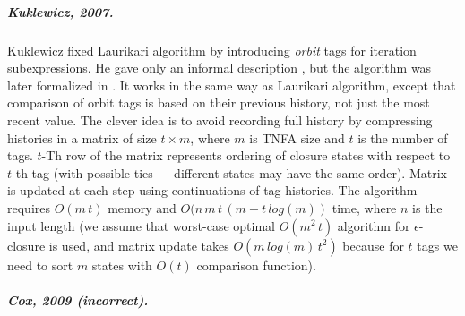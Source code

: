 \documentclass[AMA,STIX1COL]{WileyNJD-v2}
\begin{document}
\subparagraph{Kuklewicz, 2007.}

Kuklewicz fixed Laurikari algorithm by introducing \emph{orbit} tags for iteration subexpressions.
He gave only an informal description \cite{Kuk07}, but the algorithm was later formalized in \cite{Tro17}.
It works in the same way as Laurikari algorithm,
except that comparison of orbit tags is based on their previous history, not just the most recent value.
The clever idea is to avoid recording full history
by compressing histories in a matrix of size $t \times m$, where $m$ is TNFA size and $t$ is the number of tags.
$t$-Th row of the matrix represents ordering of closure states with respect to $t$-th tag
(with possible ties --- different states may have the same order).
Matrix is updated at each step using continuations of tag histories.
The algorithm requires $O(m \, t)$ memory and $O(n \, m \, t \, (m + t \, log(m))$ time, where $n$ is the input length
(we assume that worst-case optimal $O(m^2 \, t)$ algorithm for $\epsilon$-closure is used,
and matrix update takes $O(m \, log(m) \, t^2)$ because for $t$ tags we need to sort $m$ states with $O(t)$ comparison function).

\subparagraph{Cox, 2009 (incorrect).}
\end{document}
